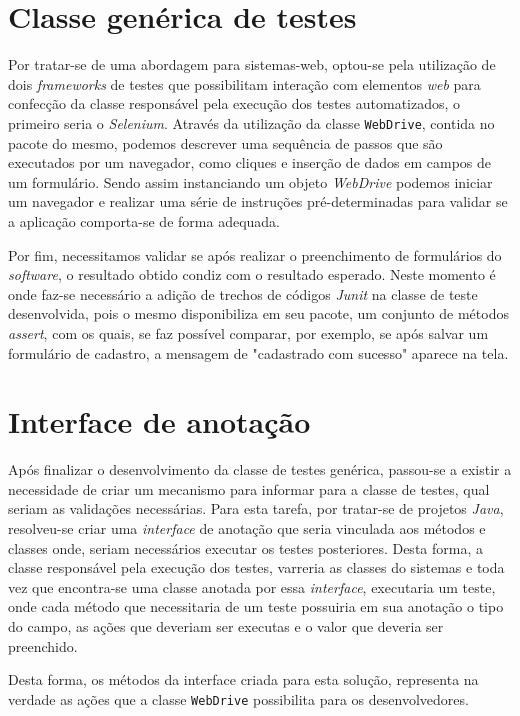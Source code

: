 \documentclass[tg]{mdtufsm}
\begin{document}
\section{Classe genérica de testes}
Por tratar-se de uma abordagem para sistemas-web, optou-se pela utilização de dois \emph{frameworks} de testes que possibilitam interação com elementos \emph{web} para confecção da classe responsável pela execução dos testes automatizados, o primeiro seria o \emph{Selenium}. Através da utilização da classe \texttt{WebDrive}, contida no pacote do mesmo, podemos descrever uma sequência de passos que são executados por um navegador, como cliques e inserção de dados em campos de um formulário. Sendo assim instanciando um objeto \emph{WebDrive} podemos iniciar um navegador e realizar uma série de instruções pré-determinadas para validar se a aplicação comporta-se de forma adequada.

Por fim, necessitamos validar se após realizar o preenchimento de formulários do \emph{software}, o resultado obtido condiz com o resultado esperado. Neste momento é onde faz-se necessário a adição de trechos de códigos \emph{Junit} na classe de teste desenvolvida, pois o mesmo disponibiliza em seu pacote, um conjunto de métodos \emph{assert}, com os quais, se faz possível comparar, por exemplo, se após salvar um formulário de cadastro, a mensagem de "cadastrado com sucesso" aparece na tela.

\section{Interface de anotação}

Após finalizar o desenvolvimento da classe de testes genérica, passou-se a existir a necessidade de criar um mecanismo para informar para a classe de testes, qual seriam as validações necessárias. Para esta tarefa, por tratar-se de projetos \emph{Java}, resolveu-se criar uma \emph{interface} de anotação que seria vinculada aos métodos e classes onde, seriam necessários executar os testes posteriores. Desta forma, a classe responsável pela execução dos testes, varreria as classes do sistemas e toda vez que encontra-se uma classe anotada por essa \emph{interface}, executaria um teste, onde cada método que necessitaria de um teste possuiria em sua anotação o tipo do campo, as ações que deveriam ser executas e o valor que deveria ser preenchido.

Desta forma, os métodos da interface criada para esta solução, representa na verdade as ações que a classe \texttt{WebDrive} possibilita para os desenvolvedores.
\end{document}
